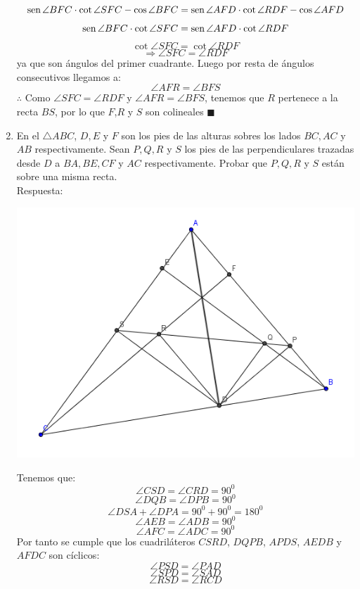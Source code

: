 \documentclass{book}
\newcommand{\sen}{\mathop{\rm sen}\nolimits} %
\begin{document}
\begin{enumerate}
          $$\sen {\angle BFC}\cdot\cot{\angle SFC}-\cos{\angle BFC}=\sen {\angle AFD}\cdot\cot{\angle RDF}-\cos{\angle AFD}$$
          $$\sen {\angle BFC}\cdot\cot{\angle SFC}=\sen {\angle AFD}\cdot\cot{\angle RDF}$$
          $$\cot{\angle SFC}=\cot{\angle RDF}$$
          $$\Rightarrow\angle SFC=\angle RDF$$
          ya que son ángulos del primer cuadrante. Luego por resta de ángulos consecutivos llegamos a:
          $$\angle AFR=\angle BFS$$
          $\therefore$ Como $\angle SFC=\angle RDF$ y $\angle AFR=\angle BFS$, tenemos que $R$ pertenece a la recta $BS$, por lo que $F$,$R$ y $S$ son colineales  $\blacksquare$\\
    \item En el $\triangle ABC$, $D ,E$ y $F$ son los pies de las alturas sobres los lados $BC,AC$ y $AB$ respectivamente. Sean $P,Q,R$ y $S$ los pies de las perpendiculares trazadas desde $D$ a $BA, BE, CF$ y $AC$ respectivamente. Probar que $P, Q, R$ y $S$ están sobre una misma recta.\\
          Respuesta:
          \begin{center}
              \includegraphics[scale=1]{imagenes/Geometria/16.png}
          \end{center}
          Tenemos que:
          $$\angle CSD=\angle CRD=90^0$$
          $$\angle DQB=\angle DPB=90^0$$
          $$\angle DSA+\angle DPA=90^0+90^0=180^0$$
          $$\angle AEB=\angle ADB=90^0$$
          $$\angle AFC=\angle ADC=90^ 0$$
          Por tanto se cumple que los cuadriláteros $CSRD$, $DQPB$, $APDS$, $AEDB$ y $AFDC$ son cíclicos:
          $$\angle PSD=\angle PAD$$
          $$\angle SPD=\angle SAD$$
          $$\angle RSD=\angle RCD$$

\end{enumerate}
\end{document}
